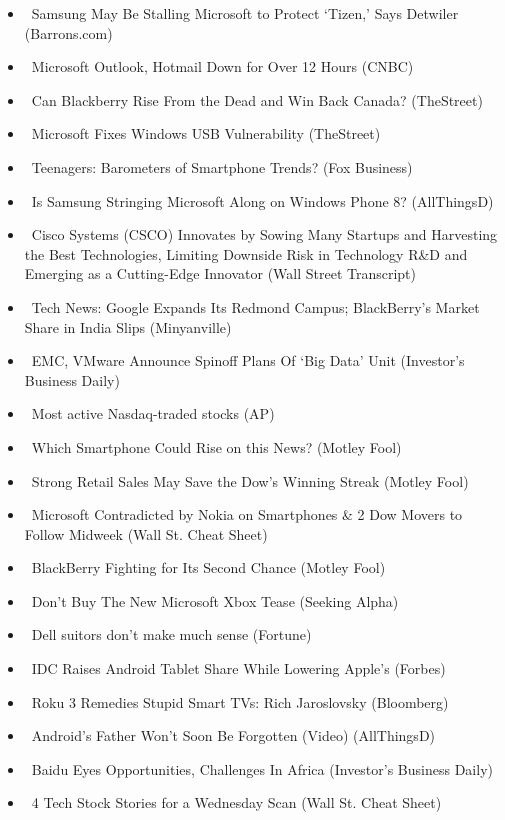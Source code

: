 \documentclass[11pt,asymmetric]{article}
\begin{document}
\begin{itemize}
\item\ Samsung May Be Stalling Microsoft to Protect `Tizen,' Says Detwiler (Barrons.com)
\item\ Microsoft Outlook, Hotmail Down for Over 12 Hours (CNBC)
\item\ Can Blackberry Rise From the Dead and Win Back Canada? (TheStreet)
\item\ Microsoft Fixes Windows USB Vulnerability (TheStreet)
\item\ Teenagers: Barometers of Smartphone Trends? (Fox Business)
\item\ Is Samsung Stringing Microsoft Along on Windows Phone 8? (AllThingsD)
\item\ Cisco Systems (CSCO) Innovates by Sowing Many Startups and Harvesting the Best Technologies, Limiting Downside Risk in Technology R\&D and Emerging as a Cutting-Edge Innovator (Wall Street Transcript)
\item\ Tech News: Google Expands Its Redmond Campus; BlackBerry's Market Share in India Slips (Minyanville)
\item\ EMC, VMware Announce Spinoff Plans Of `Big Data' Unit (Investor's Business Daily)
\item\ Most active Nasdaq-traded stocks (AP)
\item\ Which Smartphone Could Rise on this News? (Motley Fool)
\item\ Strong Retail Sales May Save the Dow's Winning Streak (Motley Fool)
\item\ Microsoft Contradicted by Nokia on Smartphones \& 2 Dow Movers to Follow Midweek (Wall St. Cheat Sheet)
\item\ BlackBerry Fighting for Its Second Chance (Motley Fool)
\item\ Don't Buy The New Microsoft Xbox Tease (Seeking Alpha)
\item\ Dell suitors don't make much sense (Fortune)
\item\ IDC Raises Android Tablet Share While Lowering Apple's (Forbes)
\item\ Roku 3 Remedies Stupid Smart TVs: Rich Jaroslovsky (Bloomberg)
\item\ Android's Father Won't Soon Be Forgotten (Video) (AllThingsD)
\item\ Baidu Eyes Opportunities, Challenges In Africa (Investor's Business Daily)
\item\ 4 Tech Stock Stories for a Wednesday Scan (Wall St. Cheat Sheet)
\end{itemize}
\end{document}
